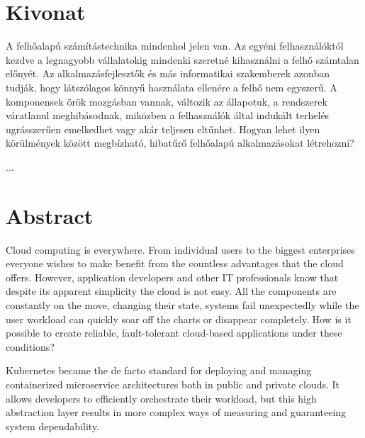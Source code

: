 \setcounter{page}{1}

\selecthungarian

\chapter*{Kivonat}

A felhőalapú számítástechnika mindenhol jelen van. Az egyéni felhasználóktól kezdve a legnagyobb vállalatokig mindenki szeretné kihasználni a felhő számtalan előnyét. Az alkalmazásfejlesztők és más informatikai szakemberek azonban tudják, hogy látszólagos könnyű használata ellenére a felhő nem egyszerű. A komponensek örök mozgásban vannak, változik az állapotuk, a rendszerek váratlanul meghibásodnak, miközben a felhasználók által indukált terhelés ugrásszerűen emelkedhet vagy akár teljesen eltűnhet. Hogyan lehet ilyen körülmények között megbízható, hibatűrő felhőalapú alkalmazásokat létrehozni?

...

\vfill
\selectenglish


\chapter*{Abstract}

Cloud computing is everywhere. From individual users to the biggest enterprises everyone wishes to make benefit from the countless advantages that the cloud offers. However, application developers and other IT professionals know that despite its apparent simplicity the cloud is not easy. All the components are constantly on the move, changing their state, systems fail unexpectedly while the user workload can quickly soar off the charts or disappear completely. How is it possible to create reliable, fault-tolerant cloud-based applications under these conditions?

Kubernetes became the de facto standard for deploying and managing containerized microservice architectures both in public and private clouds. It allows developers to efficiently orchestrate their workload, but this high abstraction layer results in more complex ways of measuring and guaranteeing system dependability.

